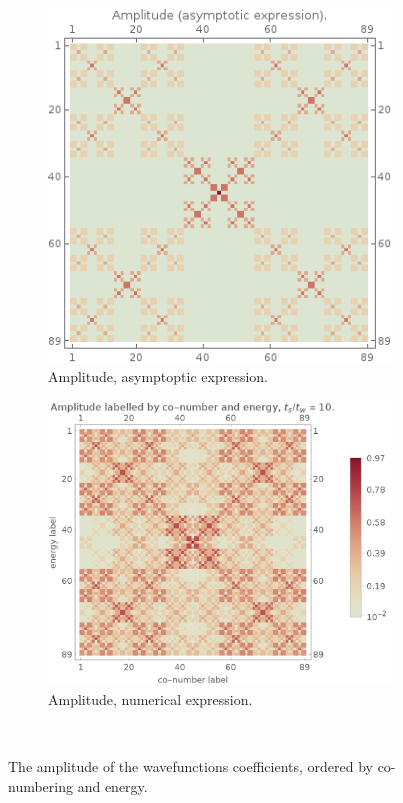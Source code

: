 \documentclass[11pt]{article}
\begin{document}
\begin{figure}[htp]

\centering
\begin{subfigure}{.5\textwidth}
  \centering
  \includegraphics[width=.8\textwidth]{img/amplitude_asym.png}
  \caption{Amplitude, asymptoptic expression.}
  \label{fig:wf_idos_asym}
\end{subfigure}%
\begin{subfigure}{.5\textwidth}
  \centering
  \includegraphics[width=1.\textwidth]{img/wf_idos.png}
  \caption{Amplitude, numerical expression.}
  \label{fig:wf_idos_num}
\end{subfigure} \\

\caption{The amplitude of the wavefunctions coefficients, ordered by co-numbering and energy. }
\label{fig:wf_idos}
\end{figure}
\end{document}

